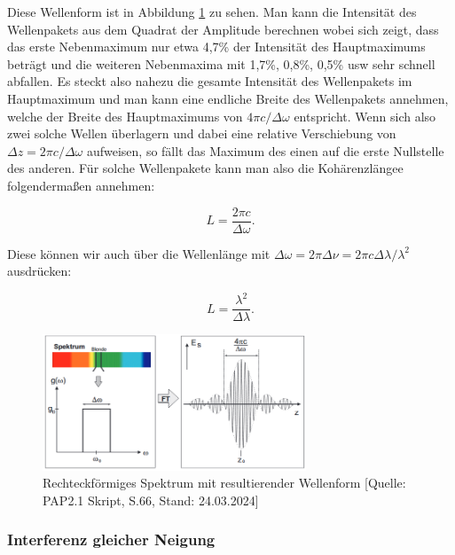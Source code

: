 \documentclass{article}
\begin{document}
Diese Wellenform ist in Abbildung \ref{fig:spektrBandbreite} zu sehen. Man kann die Intensität des Wellenpakets aus dem Quadrat der Amplitude berechnen wobei sich zeigt, dass das erste Nebenmaximum nur etwa 4,7\% der Intensität des Hauptmaximums beträgt und die weiteren Nebenmaxima mit 1,7\%, 0,8\%, 0,5\% usw sehr schnell abfallen. Es steckt also nahezu die gesamte Intensität des Wellenpakets im Hauptmaximum und man kann eine endliche Breite des Wellenpakets annehmen, welche der Breite des Hauptmaximums von $4 \pi c / \Delta \omega$ entspricht. 
Wenn sich also zwei solche Wellen überlagern und dabei eine relative Verschiebung von $\Delta z = 2 \pi c / \Delta \omega$ aufweisen, so fällt das Maximum des einen auf die erste Nullstelle des anderen. Für solche Wellenpakete kann man also die Kohärenzlängee folgendermaßen annehmen:

\begin{equation}
    L = \frac{2 \pi c}{\Delta \omega}.
\end{equation}

Diese können wir auch über die Wellenlänge mit $\Delta \omega = 2 \pi \Delta \nu = 2 \pi c \Delta \lambda / \lambda^2$ ausdrücken:

\begin{equation}
    L = \frac{\lambda^2}{\Delta \lambda}.
\end{equation}


\begin{figure}[!b]
    \centering
    \includegraphics[width=0.7\textwidth]{graphics/skript/spektrale bandbreite.png}
    \caption{Rechteckförmiges Spektrum mit resultierender Wellenform [Quelle: PAP2.1 Skript, S.66, Stand: 24.03.2024]}
    \label{fig:spektrBandbreite}
\end{figure}



\clearpage
\newpage
\subsubsection{Interferenz gleicher Neigung}
\end{document}
